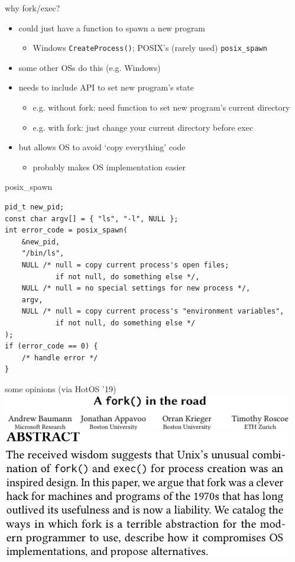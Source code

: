 \begin{frame}{why fork/exec?}
    \begin{itemize}
    \item could just have a function to spawn a new program
        \begin{itemize}
        \item Windows \texttt{CreateProcess()}; POSIX's (rarely used) \texttt{posix\_spawn}
        \end{itemize}
    \vspace{.5cm}
    \item some other OSs do this (e.g. Windows)
    \item needs to include API to set new program's state
        \begin{itemize}
        \item e.g. without fork: need function to set new program's current directory
        \item e.g. with fork: just change your current directory before exec
        \end{itemize}
    \item but allows OS to avoid `copy everything' code
        \begin{itemize}
        \item probably makes OS implementation easier
        \end{itemize}
    \end{itemize}
\end{frame}

\begin{frame}[fragile,label=posixSpawn]{posix\_spawn}
\begin{lstlisting}[style=small]
pid_t new_pid;
const char argv[] = { "ls", "-l", NULL };
int error_code = posix_spawn(
    &new_pid,
    "/bin/ls",
    NULL /* null = copy current process's open files;
            if not null, do something else */,
    NULL /* null = no special settings for new process */,
    argv,
    NULL /* null = copy current process's "environment variables", 
            if not null, do something else */
);
if (error_code == 0) {
    /* handle error */
}
\end{lstlisting}
\end{frame}

\begin{frame}{some opinions (via HotOS '19)}
\includegraphics[width=5in]{../unix-api/fork-in-road-title}
\includegraphics[width=5in]{../unix-api/fork-in-road-abs}
\end{frame}
